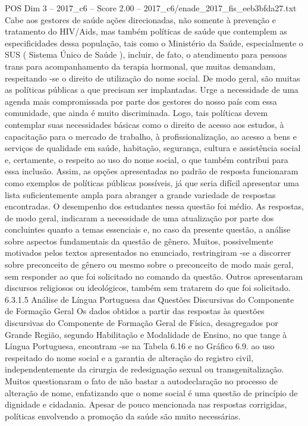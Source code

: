 \begin{textsample}{POS Dim 3 – 2017\_c6 – Score 2.00 – 2017\_c6/enade\_2017\_fis\_eeb3bfda27.txt}
Cabe aos gestores de saúde ações direcionadas, não somente à prevenção e tratamento do HIV/Aids, mas também políticas de saúde que contemplem as especificidades dessa população, tais como o Ministério da Saúde, especialmente o SUS ( Sistema Único de Saúde ), incluir, de fato, o atendimento para pessoas trans para acompanhamento da terapia hormonal, que muitas demandam, respeitando -se o direito de utilização do nome social.
De modo geral, são muitas as políticas públicas a que precisam ser implantadas.
Urge a necessidade de uma agenda mais compromissada por parte dos gestores do nosso país com essa comunidade, que ainda é muito discriminada.
Logo, tais políticas devem contemplar suas necessidades básicas como o direito de acesso aos estudos, à capacitação para o mercado de trabalho, à profissionalização, ao acesso a bens e serviços de qualidade em saúde, habitação, segurança, cultura e assistência social e, certamente, o respeito ao uso do nome social, o que também contribui para essa inclusão.
Assim, as opções apresentadas no padrão de resposta funcionaram como exemplos de políticas públicas possíveis, já que seria difícil apresentar uma lista suficientemente ampla para abranger a grande variedade de respostas encontradas.
O desempenho dos estudantes nessa questão foi médio.
As respostas, de modo geral, indicaram a necessidade de uma atualização por parte dos concluintes quanto a temas essenciais e, no caso da presente questão, a análise sobre aspectos fundamentais da questão de gênero.
Muitos, possivelmente motivados pelos textos apresentados no enunciado, restringiram -se a discorrer sobre preconceito de gênero ou mesmo sobre o preconceito de modo mais geral, sem responder ao que foi solicitado no comando da questão.
Outros apresentaram discursos religiosos ou ideológicos, também sem tratarem do que foi solicitado. 6.3.1.5 Análise de Língua Portuguesa das Questões Discursivas do Componente de Formação Geral Os dados obtidos a partir das respostas às questões discursivas do Componente de Formação Geral de Física, desagregados por Grande Região, segundo Habilitação e Modalidade de Ensino, no que tange à Língua Portuguesa, encontram -se na Tabela 6.16 e no Gráfico 6.9. ao uso respeitado do nome social e a garantia de alteração do registro civil, independentemente da cirurgia de redesignação sexual ou transgenitalização.
Muitos questionaram o fato de não bastar a autodeclaração no processo de alteração de nome, enfatizando que o nome social é uma questão de princípio de dignidade e cidadania.
Apesar de pouco mencionada nas respostas corrigidas, políticas envolvendo a promoção da saúde são muito necessárias.

\end{textsample}
